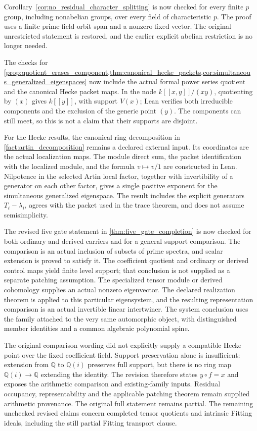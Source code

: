 \documentclass[11pt]{amsart}
\theoremstyle{definition}
\theoremstyle{remark}
\begin{document}
Corollary~\ref{cor:no_residual_character_splitting} is now checked for every finite \(p\) group, including nonabelian groups, over every field of characteristic \(p\). The proof uses a finite prime field orbit span and a nonzero fixed vector. The original unrestricted statement is restored, and the earlier explicit abelian restriction is no longer needed.

The checks for \cref{prop:quotient_erases_component,thm:canonical_hecke_packets,cor:simultaneous_generalized_eigenspaces} now include the actual formal power series quotient and the canonical Hecke packet maps. In the node \(k[[x,y]]/(xy)\), quotienting by \((x)\) gives \(k[[y]]\), with support \(V(x)\); Lean verifies both irreducible components and the exclusion of the generic point \((y)\). The components can still meet, so this is not a claim that their supports are disjoint.

For the Hecke results, the canonical ring decomposition in \cref{fact:artin_decomposition} remains a declared external input. Its coordinates are the actual localization maps. The module direct sum, the packet identification with the localized module, and the formula \(v\mapsto v/1\) are constructed in Lean. Nilpotence in the selected Artin local factor, together with invertibility of a generator on each other factor, gives a single positive exponent for the simultaneous generalized eigenspace. The result includes the explicit generators \(T_i-\lambda_i\), agrees with the packet used in the trace theorem, and does not assume semisimplicity.

The revised five gate statement in \cref{thm:five_gate_completion} is now checked for both ordinary and derived carriers and for a general support comparison. The comparison is an actual inclusion of subsets of prime spectra, and scalar extension is proved to satisfy it. The coefficient quotient and ordinary or derived control maps yield finite level support; that conclusion is not supplied as a separate patching assumption. The specialized tensor module or derived cohomology supplies an actual nonzero eigenvector. The declared realization theorem is applied to this particular eigensystem, and the resulting representation comparison is an actual invertible linear intertwiner. The system conclusion uses the family attached to the very same automorphic object, with distinguished member identities and a common algebraic polynomial spine.

The original comparison wording did not explicitly supply a compatible Hecke point over the fixed coefficient field. Support preservation alone is insufficient: extension from \(\mathbb Q\) to \(\mathbb Q(i)\) preserves full support, but there is no ring map \(\mathbb Q(i)\to\mathbb Q\) extending the identity. The revision therefore states \(y\circ f=x\) and exposes the arithmetic comparison and existing-family inputs. Residual occupancy, representability and the applicable patching theorem remain supplied arithmetic provenance. The original full statement remains partial. The remaining unchecked revised claims concern completed tensor quotients and intrinsic Fitting ideals, including the still partial Fitting transport clause.
\end{document}
